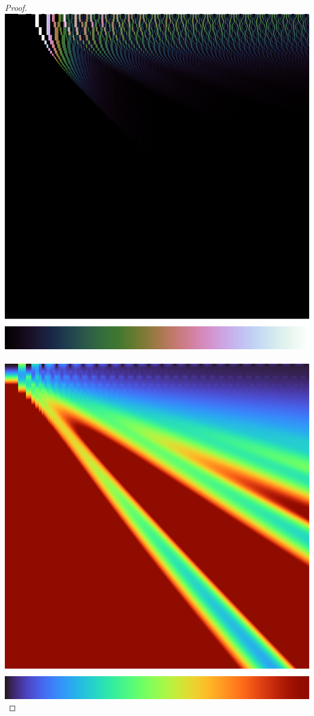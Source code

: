 \documentclass[]{article}
\begin{document}
\begin{proof}
	\vspace{0.3cm}

	\includegraphics[scale=0.3]{variance.png}\,\includegraphics[scale=0.3]{e-bias.png}


\end{proof}
\end{document}
